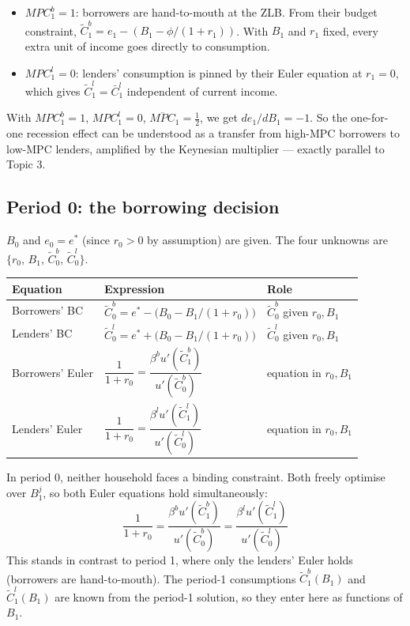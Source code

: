 \documentclass[11pt,a4paper]{article}
\begin{document}
\begin{itemize}
    \item $MPC_1^b = 1$: borrowers are hand-to-mouth at the ZLB. From their budget constraint, $\tilde{C}_1^b = e_1 - (B_1 - \phi/(1+r_1))$. With $B_1$ and $r_1$ fixed, every extra unit of income goes directly to consumption.
    \item $MPC_1^l = 0$: lenders' consumption is pinned by their Euler equation at $r_1 = 0$, which gives $\tilde{C}_1^l = \bar{C}_1^l$ independent of current income.
\end{itemize}
With $MPC_1^b = 1$, $MPC_1^l = 0$, $\overline{MPC}_1 = \frac{1}{2}$, we get $de_1/dB_1 = -1$. So the one-for-one recession effect can be understood as a transfer from high-MPC borrowers to low-MPC lenders, amplified by the Keynesian multiplier --- exactly parallel to Topic 3.

\subsection{Period 0: the borrowing decision}

$B_0$ and $e_0 = e^*$ (since $r_0 > 0$ by assumption) are given. The four unknowns are $\{r_0,\, B_1,\, \tilde{C}_0^b,\, \tilde{C}_0^l\}$.

\begin{center}
\begin{tabular}{lll}
\toprule
Equation & Expression & Role \\
\midrule
Borrowers' BC & $\tilde{C}_0^b = e^* - \bigl(B_0 - B_1/(1+r_0)\bigr)$ & $\tilde{C}_0^b$ given $r_0, B_1$ \\
Lenders' BC & $\tilde{C}_0^l = e^* + \bigl(B_0 - B_1/(1+r_0)\bigr)$ & $\tilde{C}_0^l$ given $r_0, B_1$ \\
Borrowers' Euler & $\dfrac{1}{1+r_0} = \dfrac{\beta^b u'(\tilde{C}_1^b)}{u'(\tilde{C}_0^b)}$ & equation in $r_0, B_1$ \\
Lenders' Euler & $\dfrac{1}{1+r_0} = \dfrac{\beta^l u'(\tilde{C}_1^l)}{u'(\tilde{C}_0^l)}$ & equation in $r_0, B_1$ \\
\bottomrule
\end{tabular}
\end{center}

In period 0, neither household faces a binding constraint. Both freely optimise over $B_1^j$, so both Euler equations hold simultaneously:
\begin{equation}
\frac{1}{1+r_0} = \frac{\beta^b u'(\tilde{C}_1^b)}{u'(\tilde{C}_0^b)} = \frac{\beta^l u'(\tilde{C}_1^l)}{u'(\tilde{C}_0^l)}
\end{equation}
This stands in contrast to period 1, where only the lenders' Euler holds (borrowers are hand-to-mouth). The period-1 consumptions $\tilde{C}_1^b(B_1)$ and $\tilde{C}_1^l(B_1)$ are known from the period-1 solution, so they enter here as functions of $B_1$.
\end{document}

